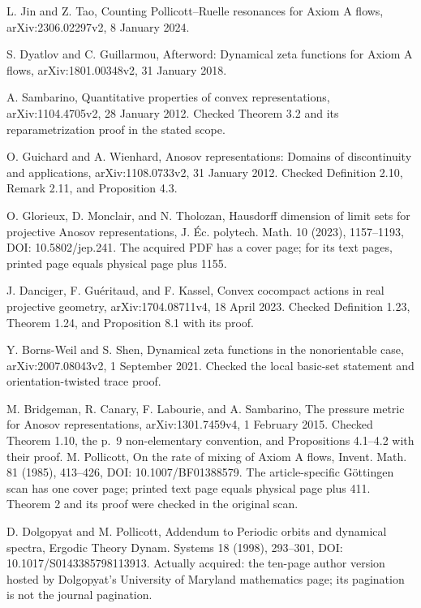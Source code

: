 \documentclass[10pt]{article}
\begin{document}
L. Jin and Z. Tao, Counting Pollicott–Ruelle resonances for Axiom A flows, arXiv:2306.02297v2, 8 January 2024.\par
S. Dyatlov and C. Guillarmou, Afterword: Dynamical zeta functions for Axiom A flows, arXiv:1801.00348v2, 31 January 2018.\par
A. Sambarino, Quantitative properties of convex representations, arXiv:1104.4705v2, 28 January 2012. Checked Theorem 3.2 and its reparametrization proof in the stated scope.\par
O. Guichard and A. Wienhard, Anosov representations: Domains of discontinuity and applications, arXiv:1108.0733v2, 31 January 2012. Checked Definition 2.10, Remark 2.11, and Proposition 4.3.\par
O. Glorieux, D. Monclair, and N. Tholozan, Hausdorff dimension of limit sets for projective Anosov representations, J. Éc. polytech. Math. 10 (2023), 1157–1193, DOI: 10.5802/jep.241. The acquired PDF has a cover page; for its text pages, printed page equals physical page plus 1155.\par
J. Danciger, F. Guéritaud, and F. Kassel, Convex cocompact actions in real projective geometry, arXiv:1704.08711v4, 18 April 2023. Checked Definition 1.23, Theorem 1.24, and Proposition 8.1 with its proof.\par
Y. Borns-Weil and S. Shen, Dynamical zeta functions in the nonorientable case, arXiv:2007.08043v2, 1 September 2021. Checked the local basic-set statement and orientation-twisted trace proof.\par
M. Bridgeman, R. Canary, F. Labourie, and A. Sambarino, The pressure metric for Anosov representations, arXiv:1301.7459v4, 1 February 2015. Checked Theorem 1.10, the p. 9 non-elementary convention, and Propositions 4.1–4.2 with their proof. M. Pollicott, On the rate of mixing of Axiom A flows, Invent. Math. 81 (1985), 413–426, DOI: 10.1007/BF01388579. The article-specific Göttingen scan has one cover page; printed text page equals physical page plus 411. Theorem 2 and its proof were checked in the original scan.\par
D. Dolgopyat and M. Pollicott, Addendum to Periodic orbits and dynamical spectra, Ergodic Theory Dynam. Systems 18 (1998), 293–301, DOI: 10.1017/S0143385798113913. Actually acquired: the ten-page author version hosted by Dolgopyat’s University of Maryland mathematics page; its pagination is not the journal pagination.\par
\end{document}
